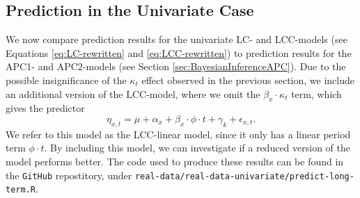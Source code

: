 \subsection{Prediction in the Univariate Case}
\label{sec:uv-pred}
We now compare prediction results for the univariate LC- and LCC-models (see Equations \ref{eq:LC-rewritten} and \ref{eq:LCC-rewritten}) to prediction results for the APC1- and APC2-models (see Section \ref{sec:BayesianInferenceAPC}). Due to the possible insignificance of the $\kappa_t$ effect observed in the previous section, we include an additional version of the LCC-model, where we omit the $\beta_x\cdot \kappa_t$ term, which gives the predictor
\begin{equation}
    \eta_{x,t} = \mu + \alpha_x + \beta_x\cdot \phi \cdot t + \gamma_k + \epsilon_{x,t}.
\end{equation}
We refer to this model as the LCC-linear model, since it only has a linear period term $\phi \cdot t$. By including this model, we can investigate if a reduced version of the model performs better. The code used to produce these results can be found in the \texttt{GitHub} repostitory, under \texttt{real-data/real-data-univariate/predict-long-term.R}. 

